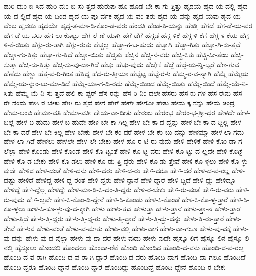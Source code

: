 {ಹುರಿ-ದುಂ-ಬಿ-ಸಿದ
ಹುರಿ-ದುಂ-ಬಿ-ಸು-ತ್ತದೆ
ಹುರುಪು
ಹೂ
ಹೂಡ-ಬೇ-ಕಾ-ಗು-ತ್ತಿತ್ತು
ಹೃದಯ
ಹೃದ-ಯ-ದಲ್ಲಿ
ಹೃದ-ಯ-ದ-ಲ್ಲಿದೆ
ಹೃದ-ಯ-ದಿಂದ
ಹೃದ-ಯ-ಪೂ-ರ್ವಕ
ಹೃದ-ಯ-ವಂ-ತರು
ಹೃದ-ಯ-ವನ್ನು
ಹೃದ-ಯವು
ಹೃದ-ಯ-ವೆಂಬ
ಹೃದಯಿ
ಹೃದಯೇ
ಹೃದ್ಗ-ತ-ಮಾ-ಡಿ-ಕೊಂ-ಡ-ವರು
ಹೆಂಡತಿ
ಹೆಂಡ-ತಿ-ಯನ್ನು
ಹೆಂಡ್ತಿ
ಹೆಗಡೆ
ಹೆಗ-ಡೆ-ಯ-ವರ
ಹೆಗ-ಡೆ-ಯ-ವರು
ಹೆಗ-ಲು-ಕೊಟ್ಟು
ಹೆಗ-ಲೆ-ಣೆ-ಯಾಗಿ
ಹೆಗೆ-ಡೆಗೆ
ಹೆಗ್ಗಡೆ
ಹೆಗ್ಗ-ಳಿಕೆ
ಹೆಗ್ಗ-ಳಿ-ಕೆಗೆ
ಹೆಗ್ಗ-ಳಿ-ಕೆಯ
ಹೆಗ್ಗ-ಳಿ-ಕೆ-ಯಿತ್ತು
ಹೆಗ್ಗು-ರು-ತಾಗಿ
ಹೆಗ್ಗು-ರುತು
ಹೆಚ್ಚಲ್ಲ
ಹೆಚ್ಚಾ-ಗ-ಬ-ಹುದು
ಹೆಚ್ಚಾಗಿ
ಹೆಚ್ಚಾ-ಗಿತ್ತು
ಹೆಚ್ಚಾ-ಗಿ-ರು-ತ್ತವೆ
ಹೆಚ್ಚಾ-ಗು-ತ್ತಿತ್ತು
ಹೆಚ್ಚಾ-ಗು-ತ್ತಿದೆ
ಹೆಚ್ಚಾ-ಯಿತು
ಹೆಚ್ಚಿತು
ಹೆಚ್ಚಿನ
ಹೆಚ್ಚಿ-ನ-ವರು
ಹೆಚ್ಚಿ-ಸಿತು
ಹೆಚ್ಚಿ-ಸೀ-ತೆಂಬ
ಹೆಚ್ಚಿ-ಸುತ್ತಾ
ಹೆಚ್ಚಿ-ಸು-ತ್ತಿತ್ತು
ಹೆಚ್ಚಿ-ಸು-ವು-ದಾ-ಗಿದೆ
ಹೆಚ್ಚು
ಹೆಚ್ಚು-ವುದು
ಹೆಚ್ಚೇಕೆ
ಹೆಜ್ಜೆ
ಹೆಜ್ಜೆ-ಯ-ನ್ನಿ-ಟ್ಟರೆ
ಹೆಣ-ಗುವ
ಹೆಣೆದು
ಹೆಣ್ಣು
ಹೆತ್ತ-ವ-ರಿ-ಗಿಂತ
ಹೆತ್ತಿದ್ದ
ಹೆದ-ರು-ತ್ತೀಯಾ
ಹೆಬ್ಬೆಟ್ಟ
ಹೆಬ್ಬೆ-ರಳು
ಹೆಮ್ಮ-ರ-ವ-ನ್ನಾಗಿ
ಹೆಮ್ಮೆ
ಹೆಮ್ಮೆಯ
ಹೆಮ್ಮೆ-ಯ-ನ್ನುಂ-ಟು-ಮಾ-ಡಿದೆ
ಹೆಮ್ಮೆ-ಯಾ-ಗ-ದಿ-ರದು
ಹೆಮ್ಮೆ-ಯಿಂದ
ಹೆಮ್ಮೆ-ಯಿತ್ತು
ಹೆಮ್ಮೆ-ಯಿದೆ
ಹೆಮ್ಮೆ-ಯೆ-ನಿ-ಸಿತು
ಹೆಮ್ಮೆ-ಯೆ-ನಿ-ಸು-ತ್ತದೆ
ಹೆಲಿ-ಕಾ-ಪ್ಟರ್
ಹೆಸ-ರನ್ನು
ಹೆಸ-ರಿ-ನಿಂ-ದಲೇ
ಹೆಸರು
ಹೆಸ-ರು-ಗಳ
ಹೆಸ-ರೇನು
ಹೆಸ-ರೇ-ನೆಂದು
ಹೇಗಿ-ರ-ಬೇಕು
ಹೇಗಿ-ರು-ತ್ತದೆ
ಹೇಗೆ
ಹೇಗೆ
ಹೇಗೇ
ಹೇಗೋ
ಹೇತು
ಹೇಮ-ಕ್ಕ-ನನ್ನು
ಹೇಮ-ಚಂದ್ರ
ಹೇಮ-ಲಂಬಿ
ಹೇಮಾ-ವತಿ
ಹೇಮಾ-ವತೀ
ಹೇಯ-ವಾ-ದೀತು
ಹೇರಂಬ
ಹೇರಂಭ
ಹೇರಂ-ಭ-ಶ್ರೀ-ಧರ
ಹೇಳದೇ
ಹೇಳ-ಬಲ್ಲೆ
ಹೇಳ-ಬ-ಹುದು
ಹೇಳ-ಬ-ಹುದೇ
ಹೇಳ-ಬೇ-ಕಾ-ಗಿಲ್ಲ
ಹೇಳ-ಬೇ-ಕಾ-ದ-ದ್ದನ್ನು
ಹೇಳ-ಬೇ-ಕಾ-ದ-ದ್ದಿಲ್ಲ
ಹೇಳ-ಬೇ-ಕಾ-ದರೆ
ಹೇಳ-ಬೇ-ಕಿಲ್ಲ
ಹೇಳ-ಬೇಕು
ಹೇಳ-ಬೇ-ಕೆಂ-ದರೆ
ಹೇಳ-ಬೇ-ಕೆಂ-ಬು-ದನ್ನು
ಹೇಳಮ್ಮಾ
ಹೇಳ-ಲಾ-ಗದು
ಹೇಳ-ಲಾ-ಗಿದೆ
ಹೇಳಲು
ಹೇಳಲೇ
ಹೇಳ-ಲೇ-ಬೇಕು
ಹೇಳ-ಹೊ-ರ-ಟಿ-ರು-ವುದು
ಹೇಳಿ
ಹೇಳಿಕೆ
ಹೇಳಿ-ಕೊಂ-ಡಾ-ಗ-ಲೆಲ್ಲಾ
ಹೇಳಿ-ಕೊಂಡು
ಹೇಳಿ-ಕೊಂಡೆ
ಹೇಳಿ-ಕೊ-ಟ್ಟಂತೆ
ಹೇಳಿ-ಕೊ-ಟ್ಟ-ವರು
ಹೇಳಿ-ಕೊ-ಟ್ಟು-ದ-ಲ್ಲದೇ
ಹೇಳಿ-ಕೊಟ್ಟೆ
ಹೇಳಿ-ಕೊ-ಡ-ಬೇಕು
ಹೇಳಿ-ಕೊ-ಡಲು
ಹೇಳಿ-ಕೊ-ಡು-ತ್ತಿ-ದ್ದರು
ಹೇಳಿ-ಕೊ-ಡು-ತ್ತೇವೆ
ಹೇಳಿ-ಕೊ-ಳ್ಳಲು
ಹೇಳಿ-ಕೊ-ಳ್ಳು-ವುದೇ
ಹೇಳಿದ
ಹೇಳಿ-ದಂತೆ
ಹೇಳಿ-ದನು
ಹೇಳಿ-ದರು
ಹೇಳಿ-ದ-ರು
ಹೇಳಿ-ದರೂ
ಹೇಳಿ-ದರೆ
ಹೇಳಿ-ದ-ವ-ರಲ್ಲ
ಹೇಳಿ-ದಷ್ಟು
ಹೇಳಿದೆ
ಹೇಳಿದ್ದ
ಹೇಳಿ-ದ್ದ-ರಂತೆ
ಹೇಳಿ-ದ್ದರು
ಹೇಳಿ-ದ್ದಾನೆ
ಹೇಳಿ-ದ್ದಾರೆ
ಹೇಳಿ-ದ್ದಿದೆ
ಹೇಳಿ-ದ್ದು
ಹೇಳಿದ್ದೂ
ಹೇಳಿದ್ದೆ
ಹೇಳಿ-ದ್ದೆಲ್ಲ
ಹೇಳಿದ್ದೇ
ಹೇಳಿ-ಮಾ-ಡಿ-ಸಿ-ದಂ-ತಿ-ದ್ದರು
ಹೇಳಿ-ರ-ಬೇಕು
ಹೇಳಿ-ರು-ವಂತೆ
ಹೇಳಿ-ರು-ವರು
ಹೇಳಿ-ರು-ವುದು
ಹೇಳಿ-ಲ್ಲವೇ
ಹೇಳಿ-ಸಿ-ಕೊಂ-ಡಿ-ದ್ದೇನೆ
ಹೇಳಿ-ಸಿ-ಕೊಂಡು
ಹೇಳಿ-ಸಿ-ಕೊಂಡೆ
ಹೇಳಿ-ಸಿ-ಕೊ-ಳ್ಳ-ತ್ತಾರೆ
ಹೇಳಿ-ಸಿ-ಕೊ-ಳ್ಳಲು
ಹೇಳಿ-ಸಿ-ಕೊ-ಳ್ಳು-ವು-ದ-ಕ್ಕಾಗಿ
ಹೇಳು
ಹೇಳು-ತ್ತದೆ
ಹೇಳುತ್ತಾ
ಹೇಳು-ತ್ತಾನೆ
ಹೇಳು-ತ್ತಾ-ನೆ
ಹೇಳು-ತ್ತಾರೆ
ಹೇಳು-ತ್ತಿದೆ
ಹೇಳು-ತ್ತಿ-ದ್ದರು
ಹೇಳು-ತ್ತಿ-ದ್ದ-ರು
ಹೇಳು-ತ್ತಿ-ದ್ದಾರೆ
ಹೇಳು-ತ್ತಿ-ದ್ದು-ದನ್ನು
ಹೇಳು-ತ್ತಿ-ರು-ತ್ತಾರೆ
ಹೇಳು-ತ್ತೇವೆ
ಹೇಳುವ
ಹೇಳು-ವಂತೆ
ಹೇಳು-ವ-ಮಾತು
ಹೇಳು-ವಲ್ಲಿ
ಹೇಳು-ವಾಗ
ಹೇಳು-ವಾ-ಗಲೂ
ಹೇಳು-ವು-ದಕ್ಕೆ
ಹೇಳು-ವು-ದನ್ನು
ಹೇಳು-ವು-ದ-ನ್ನೆಲ್ಲಾ
ಹೇಳು-ವು-ದಾ-ದರೆ
ಹೇಳು-ವುದು
ಹೇಳು-ವುದೇ
ಹೈಸ್ಕೂ-ಲಿಗೆ
ಹೈಸ್ಕೂ-ಲಿನ
ಹೈಸ್ಕೂ-ಲಿ-ನಲ್ಲಿ
ಹೈಸ್ಕೂಲು
ಹೊಂದಲಿ
ಹೊಂದಲು
ಹೊಂದಾ-ಣಿಕೆ
ಹೊಂದಿ
ಹೊಂದಿದ
ಹೊಂದಿ-ದ-ವನು
ಹೊಂದಿ-ದ-ವ-ರಲ್ಲ
ಹೊಂದಿ-ದ-ವ-ರಾಗಿ
ಹೊಂದಿ-ದ-ವ-ರಾ-ಗಿ-ದ್ದಾರೆ
ಹೊಂದಿ-ದ-ವರು
ಹೊಂದಿ-ದಾಗ
ಹೊಂದಿ-ದಾ-ಗಲೂ
ಹೊಂದಿದೆ
ಹೊಂದಿ-ದ್ದರೂ
ಹೊಂದಿ-ದ್ದಾನೆ
ಹೊಂದಿ-ದ್ದಾರೆ
ಹೊಂದಿದ್ದು
ಹೊಂದಿದ್ದೆ
ಹೊಂದಿ-ದ್ದೇನೆ
ಹೊಂದಿ-ರ-ಬೇಕು
}
